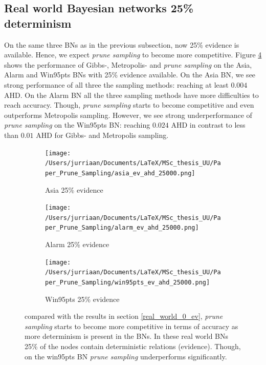 \documentclass[a4paper, twoside, 11pt]{report}
\theoremstyle{plain}
\theoremstyle{definition}
\theoremstyle{remark}
\newcommand{\ps}{\textit{prune sampling }}
\begin{document}
\subsection{Real world Bayesian networks 25\% determinism}\label{real_world_25_ev}
On the same three BNs as in the previous subsection, now 25\% evidence is available. Hence, we expect \ps to become more competitive. Figure \ref{results2} shows the performance of Gibbs-, Metropolis- and \ps on the Asia, Alarm and Win95pts BNs with 25\% evidence available. On the Asia BN, we see strong performance of all three the sampling methods: reaching at least $0.004$ AHD. On the Alarm BN all the three sampling methods have more difficulties to reach accuracy. Though, \ps starts to become competitive and even outperforms Metropolis sampling. However, we see strong underperformance of \ps on the Win95pts BN: reaching $0.024$ AHD in contrast to less than $0.01$ AHD for Gibbs- and Metropolis sampling.
\begin{figure}[H]
\centering
\begin{subfigure}{0.5\textwidth}
\texttt{[image: /Users/jurriaan/Documents/LaTeX/MSc\_thesis\_UU/Paper\_Prune\_Sampling/asia\_ev\_ahd\_25000.png]}
\caption{Asia 25\% evidence}%
\label{asia}%
\end{subfigure}\hfill%
\begin{subfigure}{0.5\textwidth}
\texttt{[image: /Users/jurriaan/Documents/LaTeX/MSc\_thesis\_UU/Paper\_Prune\_Sampling/alarm\_ev\_ahd\_25000.png]}
\caption{Alarm 25\% evidence}%
\label{alarm}%
\end{subfigure}%
\begin{subfigure}{0.5\textwidth}
\texttt{[image: /Users/jurriaan/Documents/LaTeX/MSc\_thesis\_UU/Paper\_Prune\_Sampling/win95pts\_ev\_ahd\_25000.png]}
\caption{Win95pts 25\% evidence}%
\label{win95pts}%
\end{subfigure}\hfill%
\vspace{0.75pc}
\caption{compared with the results in section \ref{real_world_0_ev}, \ps starts to become more competitive in terms of accuracy as more determinism is present in the BNs. In these real world BNs 25\% of the nodes contain deterministic relations (evidence). Though, on the win95pts BN \ps underperforms significantly.}
\label{results2}
\end{figure}

\newpage
\end{document}

